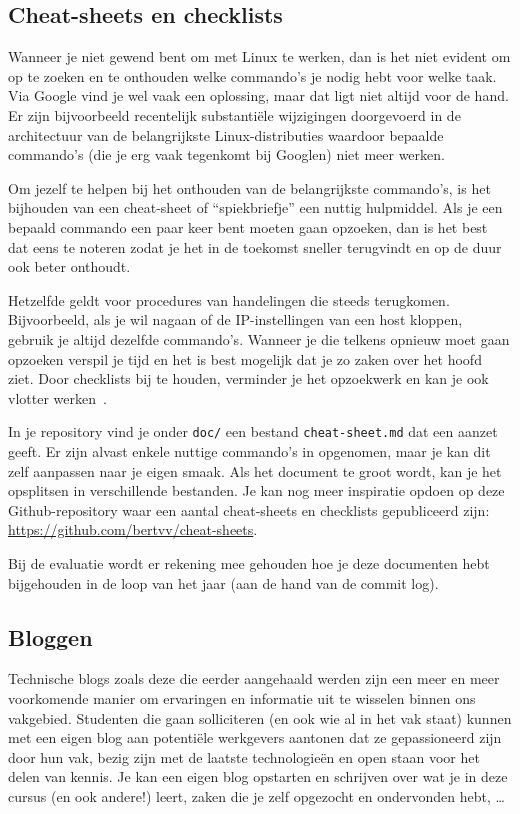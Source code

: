 \subsection{Cheat-sheets en checklists}
\label{subs:cheat-sheets-en-checklists}

Wanneer je niet gewend bent om met Linux te werken, dan is het niet evident om op te zoeken en te onthouden welke commando's je nodig hebt voor welke taak. Via Google vind je wel vaak een oplossing, maar dat ligt niet altijd voor de hand. Er zijn bijvoorbeeld recentelijk substantiële wijzigingen doorgevoerd in de architectuur van de belangrijkste Linux-distributies waardoor bepaalde commando's (die je erg vaak tegenkomt bij Googlen) niet meer werken.

Om jezelf te helpen bij het onthouden van de belangrijkste commando's, is het bijhouden van een cheat-sheet of ``spiekbriefje'' een nuttig hulpmiddel. Als je een bepaald commando een paar keer bent moeten gaan opzoeken, dan is het best dat eens te noteren zodat je het in de toekomst sneller terugvindt en op de duur ook beter onthoudt.

Hetzelfde geldt voor procedures van handelingen die steeds terugkomen.  Bijvoorbeeld, als je wil nagaan of de IP-instellingen van een host kloppen, gebruik je altijd dezelfde commando's. Wanneer je die telkens opnieuw moet gaan opzoeken verspil je tijd en het is best mogelijk dat je zo zaken over het hoofd ziet. Door checklists bij te houden, verminder je het opzoekwerk en kan je ook vlotter werken~\autocite{Simmons2009}.

In je repository vind je onder \texttt{doc/} een bestand \texttt{cheat-sheet.md} dat een aanzet geeft. Er zijn alvast enkele nuttige commando's in opgenomen, maar je kan dit zelf aanpassen naar je eigen smaak. Als het document te groot wordt, kan je het opsplitsen in verschillende bestanden. Je kan nog meer inspiratie opdoen op deze Github-repository waar een aantal cheat-sheets en checklists gepubliceerd zijn: \url{https://github.com/bertvv/cheat-sheets}.

Bij de evaluatie wordt er rekening mee gehouden hoe je deze documenten hebt bijgehouden in de loop van het jaar (aan de hand van de commit log).

\subsection{Bloggen}
\label{subs:bloggen}

Technische blogs zoals deze die eerder aangehaald werden zijn een meer en meer voorkomende manier om ervaringen en informatie uit te wisselen binnen ons vakgebied. Studenten die gaan solliciteren (en ook wie al in het vak staat) kunnen met een eigen blog aan potentiële werkgevers aantonen dat ze gepassioneerd zijn door hun vak, bezig zijn met de laatste technologieën en open staan voor het delen van kennis. Je kan een eigen blog opstarten en schrijven over wat je in deze cursus (en ook andere!) leert, zaken die je zelf opgezocht en ondervonden hebt, \ldots

